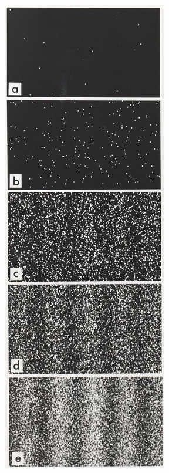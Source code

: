 \begin{minipage}{0.2\textwidth}
\begin{figure}[H]
\centering
\graphicspath{{physics/}}
\includegraphics[width=\linewidth]{double-slit-exp.jpg}
\label{fig:double-slit-exp}
\end{figure}
\end{minipage}

